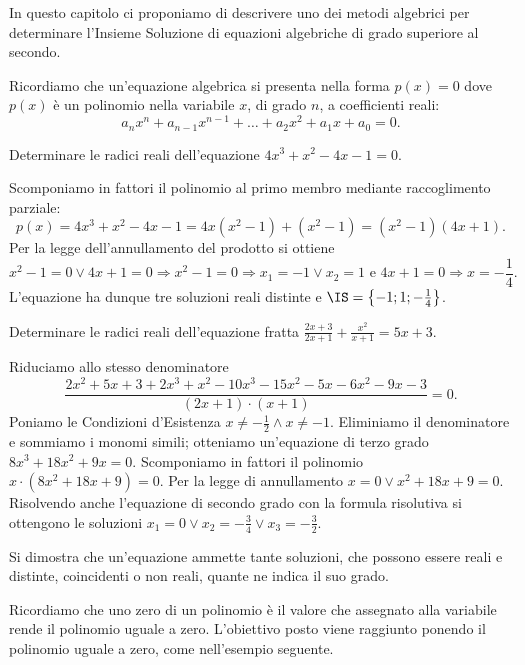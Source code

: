 In questo capitolo ci proponiamo di descrivere uno dei metodi algebrici per 
determinare l'Insieme Soluzione di equazioni algebriche di grado superiore 
al secondo.

Ricordiamo che un'equazione algebrica si presenta nella forma $p(x)=0$ dove 
$p(x)$ è un polinomio nella variabile $x$, di grado $n$, a coefficienti reali: 
\[a_nx^n+a_{n-1}x^{n-1}+ \ldots +a_2x^2+a_1x+a_0=0.\]

\begin{esempio}
Determinare le radici reali dell'equazione $4x^3+x^2-4x-1=0$.

Scomponiamo in fattori il polinomio al primo membro mediante raccoglimento 
parziale: 
\[p(x)=4x^3+x^2-4x-1=4x 
\left(x^2-1\right)+\left(x^2-1\right)=\left(x^2-1\right) 
(4x+1).\] 
Per la legge dell'annullamento del prodotto si ottiene 
\[x^2-1=0\vee 4x+1=0 \Rightarrow x^2-1=0\Rightarrow x_1=-1\vee x_2=1\text{ e 
}4x+1=0\Rightarrow x=-\frac{1}{4}.\] L'equazione ha dunque tre soluzioni reali 
distinte e $\IS=\left\{-1;1;-\frac 1 4\right\}$.
\end{esempio}
\begin{esempio}
Determinare le radici reali dell'equazione fratta 
$\frac{2x+3}{2x+1}+\frac{x^2}{x+1}=5x+3$.

Riduciamo allo stesso denominatore 
\[\frac{2x^2+5x+3+2x^3+x^2-10x^3-15x^2-5x-6x^2-9x-3}{(2x+1)\cdot (x+1)}=0.\]
Poniamo le Condizioni d'Esistenza $x\neq -\frac 1 2\wedge x\neq -1$. Eliminiamo 
il denominatore e sommiamo i monomi simili; otteniamo un'equazione di terzo 
grado $8x^3+18x^2+9x=0$. Scomponiamo in fattori il polinomio $x\cdot 
\left(8x^2+18x+9\right)=0$. Per la legge di annullamento $x=0\vee x^2+18x+9=0$. 
Risolvendo anche l'equazione di secondo grado con la formula risolutiva si 
ottengono le soluzioni $x_1=0\vee x_2=-\frac 3 4\vee x_3=-\frac 3 2$.

\osservazione
Si dimostra che un'equazione ammette tante soluzioni, che possono essere reali 
e 
distinte, coincidenti o non reali, quante ne indica il suo grado.

Ricordiamo che uno zero di un polinomio è il valore che assegnato alla 
variabile 
rende il polinomio uguale a zero. L'obiettivo posto viene raggiunto ponendo il 
polinomio uguale a zero, come nell'esempio seguente.
\end{esempio}

